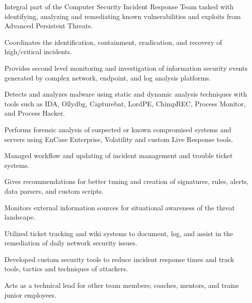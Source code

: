 \documentclass[letter,10pt]{article}
\begin{document}
\begin{zitemize}
\item Integral part of the Computer Security Incident Response Team tasked with identifying, analyzing and remediating known vulnerabilities and exploits from Advanced Persistent Threats.
\item Coordinates the identification, containment, eradication, and recovery of high/critical incidents. 
\item Provides second level monitoring and investigation of information security events generated by complex network, endpoint, and log analysis platforms. 
\item Detects and analyzes malware using static and dynamic analysis techniques with tools such as IDA, Ollydbg, Capturebat, LordPE, ChimpREC, Process Monitor, and Process Hacker. 
\item Performs forensic analysis of suspected or known compromised systems and servers using EnCase Enterprise, Volatility and custom Live Response tools.
\item Managed workflow and updating of incident management and trouble ticket systems. 
\item Gives recommendations for better tuning and creation of signatures, rules, alerts, data parsers, and custom scripts. 
\item Monitors external information sources for situational awareness of the threat landscape. 
\item Utilized ticket tracking and wiki systems to document, log, and assist in the remediation of daily network security issues. 
\item Developed custom security tools to reduce incident response times and track tools, tactics and techniques of attackers. 
\item Acts as a technical lead for other team members; coaches, mentors, and trains junior employees. 

\end{zitemize}

\end{document}
